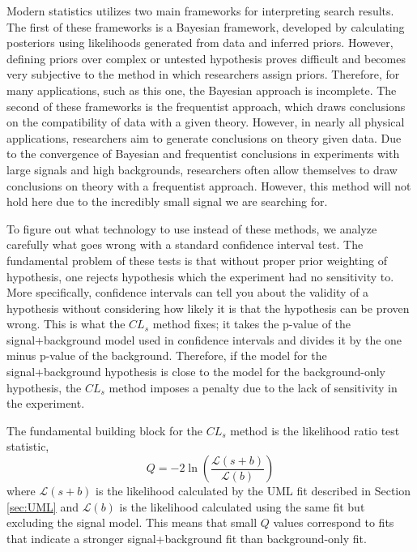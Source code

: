 Modern statistics utilizes two main frameworks for interpreting search results. The first of these frameworks is a Bayesian framework, developed by calculating posteriors using likelihoods generated from data and inferred priors. However, defining priors over complex or untested hypothesis proves difficult and becomes very subjective to the method in which researchers assign priors. Therefore, for many applications, such as this one, the Bayesian approach is incomplete. The second of these frameworks is the frequentist approach, which draws conclusions on the compatibility of data with a given theory. However, in nearly all physical applications, researchers aim to generate conclusions on theory given data. Due to the convergence of Bayesian and frequentist conclusions in experiments with large signals and high backgrounds, researchers often allow themselves to draw conclusions on theory with a frequentist approach. However, this method will not hold here due to the incredibly small signal we are searching for.

To figure out what technology to use instead of these methods, we analyze carefully what goes wrong with a standard confidence interval test. The fundamental problem of these tests is that without proper prior weighting of hypothesis, one rejects hypothesis which the experiment had no sensitivity to. More specifically, confidence intervals can tell you about the validity of a hypothesis without considering how likely it is that the hypothesis can be proven wrong. This is what the $CL_s$ method fixes; it takes the p-value of the signal+background model used in confidence intervals and divides it by the one minus p-value of the background. Therefore, if the model for the signal+background hypothesis is close to the model for the background-only hypothesis, the $CL_s$ method imposes a penalty due to the lack of sensitivity in the experiment. 

The fundamental building block for the $CL_s$ method is the likelihood ratio test statistic, 
\begin{equation}
    Q = -2 \ln \left(\frac{\mathcal{L}(s+b)}{\mathcal{L}(b)}\right)
\end{equation}
where $\mathcal{L}(s+b)$ is the likelihood calculated by the UML fit described in Section \ref{sec:UML} and $\mathcal{L}(b)$ is the likelihood calculated using the same fit but excluding the signal model. This means that small $Q$ values correspond to fits that indicate a stronger signal+background fit than background-only fit. 

